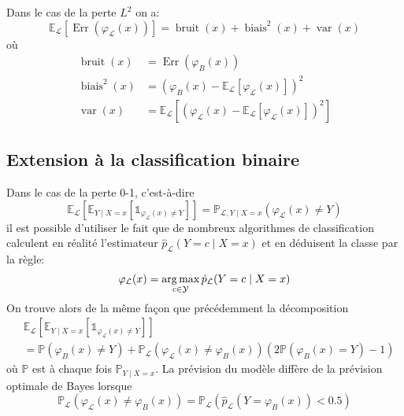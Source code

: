 \begin{theoreme}
    Dans le cas de la perte $L^2$ on a:
    \begin{equation}
        \mathbb{E}_{\mathcal{L}} \left[ \operatorname{Err} ( \varphi_{\mathcal{L}} (x) ) \right] = \operatorname{bruit} (x) + \operatorname{biais}^2 (x) + \operatorname{var} (x)
    \end{equation}
    où
    \begin{align*}
        \operatorname{bruit} (x) &= \operatorname{Err} (\varphi_{B} (x) ) \\
        \operatorname{biais}^2 (x) &= ( \varphi_B (x) - \mathbb{E}_{\mathcal{L}} \left[ \varphi_{\mathcal{L}} (x) \right] )^2 \\
        \operatorname{var} (x) &= \mathbb{E}_{\mathcal{L}} \left[ \left( \varphi_{\mathcal{L}} (x) - \mathbb{E}_{\mathcal{L}} [ \varphi_{\mathcal{L}} (x) ] \right)^2 \right]
    \end{align*}
\end{theoreme}

\subsection{Extension à la classification binaire}

Dans le cas de la perte 0-1, c'est-à-dire 
\begin{equation*}
    \mathbb{E}_{\mathcal{L}} \left[ \mathbb{E}_{Y \mid X = x} [ \mathds{1}_{\varphi_{\mathcal{L}} (x) \neq Y } ] \right] = \mathbb{P}_{\mathcal{L},Y \mid X = x} ( \varphi_{\mathcal{L}} (x) \neq Y )
\end{equation*}
il est possible d'utiliser le fait que de nombreux algorithmes de classification calculent en réalité l'estimateur $ \hat{p}_{\mathcal{L}} ( Y = c \mid X = x ) $ et en déduisent la classe par la règle:
\begin{equation*}
    \varphi_{\mathcal{L}} (x) = \operatorname*{arg\,max}_{c \in \mathcal{Y}} \hat{p}_\mathcal{L} ( Y = c \mid X = x )
\end{equation*}
On trouve alors de la même façon que précédemment la décomposition
\begin{align*}
    &\mathbb{E}_{\mathcal{L}} \left[ \mathbb{E}_{Y \mid X = x} \left[ \mathds{1}_{\varphi_{\mathcal{L}} (x) \neq Y } \right]  \right] \\
    &= \mathbb{P} \left( \varphi_B (x) \neq Y \right) + \mathbb{P}_{\mathcal{L}} \left( \varphi_{\mathcal{L}} (x) \neq \varphi_B (x) \right) \left( 2 \mathbb{P} \left( \varphi_B (x) = Y \right) - 1 \right)
\end{align*}
où $\mathbb{P}$ est à chaque fois $\mathbb{P}_{Y \mid X = x}$. La prévision du modèle diffère de la prévision optimale de Bayes lorsque
\begin{equation*}
    \mathbb{P}_{\mathcal{L}} \left( \varphi_{\mathcal{L}} (x) \neq \varphi_B (x) \right) = \mathbb{P}_{\mathcal{L}} \left( \hat{p}_{\mathcal{L}} (Y = \varphi_B (x) ) < 0.5 \right)
\end{equation*}

